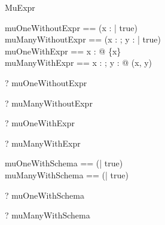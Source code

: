 \begin{zsection}
  \SECTION MuExpr
\end{zsection}

\begin{zed}
  muOneWithoutExpr == (\mu x : \nat | true)\\
  muManyWithoutExpr == (\mu x : \nat; y : \power \nat | true)\\
  muOneWithExpr == \mu x : \nat @ \{x\}\\
  muManyWithExpr == \mu x : \nat; y : \power \nat @ (x, y)
\end{zed}

\begin{zed} \vdash? muOneWithoutExpr \in \nat \end{zed}
\begin{zed} \vdash? muManyWithoutExpr \in \nat \cross \power \nat \end{zed}
\begin{zed} \vdash? muOneWithExpr \in \power \nat \end{zed}
\begin{zed} \vdash? muManyWithExpr \in \nat \cross \power \nat \end{zed}

\begin{zed}
  muOneWithSchema == (\mu [x : \nat] | true)\\
  muManyWithSchema == ( | true)
\end{zed}

\begin{zed} \vdash? muOneWithSchema \in [x : \nat] \end{zed}
\begin{zed} \vdash? muManyWithSchema  \end{zed}
